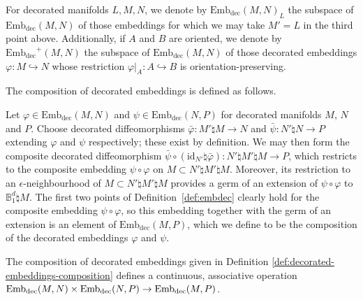 \documentclass[AHL,Unicode,published]{cedram}
\newcommand{\id}{\mathrm{id}}
\newcommand{\rdec}{\mathrm{dec}}
\newcommand{\bB}{\mathbb{B}}
\newcommand{\embdec}{\ensuremath{\mathrm{Emb}_{\rdec}}}
\begin{document}
\begin{nota}\label{notation:decorated-embeddings}
For decorated manifolds $L,M,N$, we denote by $\embdec(M,N)_L$ the subspace of $\embdec(M,N)$ of those embeddings for which we may take $M' = L$ in the third point above. Additionally, if $A$ and $B$ are oriented, we denote by $\embdec^{+}(M,N)$ the subspace of $\embdec(M,N)$ of those decorated embeddings $\varphi \colon M \hookrightarrow N$ whose restriction $\varphi|_A \colon A \hookrightarrow B$ is orientation-preserving.
\end{nota}

The composition of decorated embeddings is defined as follows.

\begin{defi}\label{def:decorated-embeddings-composition}
Let $\varphi\in\embdec(M,N)$ and $\psi\in\embdec(N,P)$ for decorated manifolds $M$, $N$ and $P$. Choose decorated diffeomorphisms $\bar{\varphi} \colon M' \natural M \to N$ and $\bar{\psi} \colon N' \natural N \to P$ extending $\varphi$ and $\psi$ respectively; these exist by definition. We may then form the composite decorated diffeomorphism $\bar{\psi} \circ (\id_{N'} \natural \bar{\varphi}) \colon N' \natural M' \natural M \to P$, which restricts to the composite embedding $\psi \circ \varphi$ on $M \subset N' \natural M' \natural M$. Moreover, its restriction to an $\epsilon$-neighbourhood of $M \subset N' \natural M' \natural M$ provides a germ of an extension of $\psi \circ \varphi$ to $\bB_{1}^d \natural M$. The first two points of Definition~\ref{def:embdec} clearly hold for the composite embedding $\psi \circ \varphi$, so this embedding together with the germ of an extension is an element of $\embdec(M,P)$, which we define to be the composition of the decorated embeddings $\varphi$ and $\psi$.
\end{defi}

\begin{lemm}\label{lem:decorated-embeddings-composition-continuous-associative}
The composition of decorated embeddings given in Defini\-tion \ref{def:decorated-embeddings-composition} defines a continuous, associative operation $\embdec(M,N) \times \embdec(N,P)\newline \to \embdec(M,P)$.
\end{lemm}
\end{document}
